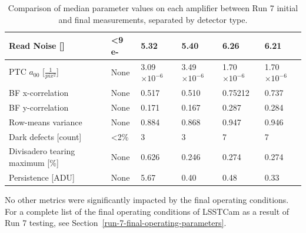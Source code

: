 \begin{table}[ht]
{\begin{tabular}{|l|l|ll|ll|}
Read Noise {[}{]}           &                      <9 e-        & \multicolumn{1}{l|}{5.32}              &      5.40      & \multicolumn{1}{l|}{6.26}              &      6.21     \\ \hline
PTC $a_{00}$ [$\frac{1}{pix^2}$]  &      None                          & \multicolumn{1}{l|}{3.09$\times10^{-6}$}              &       3.49$\times10^{-6}$      & \multicolumn{1}{l|}{1.70$\times10^{-6}$}              &        1.70$\times10^{-6}$     \\ \hline
BF x-correlation                  &      None                          & \multicolumn{1}{l|}{0.517}              &     0.510        & \multicolumn{1}{l|}{0.75212}              &       0.737      \\ \hline
BF y-correlation                  &        None                        & \multicolumn{1}{l|}{0.171}              &       0.167      & \multicolumn{1}{l|}{0.287}              &        0.284     \\ \hline
Row-means variance                &       None                         & \multicolumn{1}{l|}{0.884}              &      0.868       & \multicolumn{1}{l|}{0.947}              &        0.946     \\ \hline
Dark defects {[}count{]}          &       <2\%                          & \multicolumn{1}{l|}{3}              &       3      & \multicolumn{1}{l|}{7}              &       7      \\ \hline
Divisadero tearing maximum {[}\%{]} &     None                     & \multicolumn{1}{l|}{0.626}              &       0.246      & \multicolumn{1}{l|}{0.274}              &       0.274      \\ \hline
Persistence {[}ADU{]}             &       None                         & \multicolumn{1}{l|}{5.67}              &       0.40      & \multicolumn{1}{l|}{0.48}              &       0.33      \\ \hline
\end{tabular}
}
\caption{Comparison of median parameter values on each amplifier between Run 7 initial and final measurements, separated by detector type.}
\label{table:FinalChar-paramTable}
\end{table}



No other metrics were significantly impacted by the final operating conditions. For a complete list of the final operating conditions of LSSTCam as a result of Run 7 testing, see Section~\ref{run-7-final-operating-parameters}.


